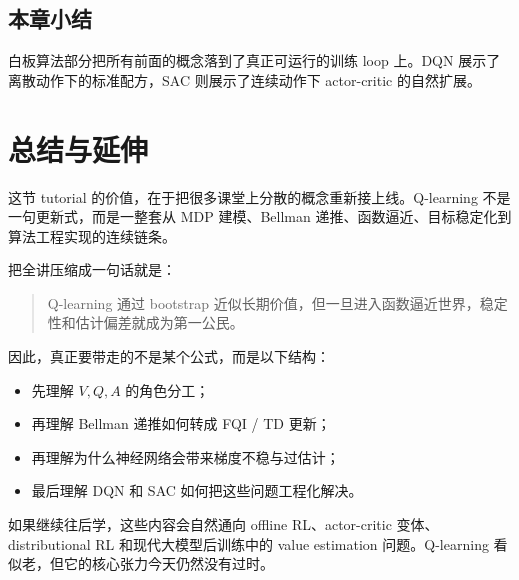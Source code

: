 \documentclass[a4paper]{article}
\begin{document}
\subsection{本章小结}

白板算法部分把所有前面的概念落到了真正可运行的训练 loop 上。DQN 展示了离散动作下的标准配方，SAC 则展示了连续动作下 actor-critic 的自然扩展。

\section{总结与延伸}

这节 tutorial 的价值，在于把很多课堂上分散的概念重新接上线。Q-learning 不是一句更新式，而是一整套从 MDP 建模、Bellman 递推、函数逼近、目标稳定化到算法工程实现的连续链条。

把全讲压缩成一句话就是：
\begin{quote}
Q-learning 通过 bootstrap 近似长期价值，但一旦进入函数逼近世界，稳定性和估计偏差就成为第一公民。
\end{quote}

因此，真正要带走的不是某个公式，而是以下结构：
\begin{itemize}
\item 先理解 \(V, Q, A\) 的角色分工；
\item 再理解 Bellman 递推如何转成 FQI / TD 更新；
\item 再理解为什么神经网络会带来梯度不稳与过估计；
\item 最后理解 DQN 和 SAC 如何把这些问题工程化解决。
\end{itemize}

如果继续往后学，这些内容会自然通向 offline RL、actor-critic 变体、distributional RL 和现代大模型后训练中的 value estimation 问题。Q-learning 看似老，但它的核心张力今天仍然没有过时。
\end{document}
